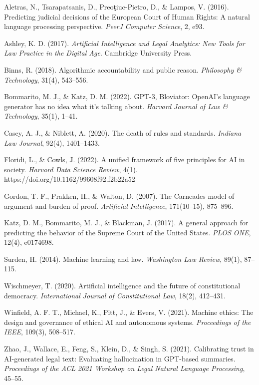 \documentclass[12pt,a4paper]{article}
\begin{document}
\begin{thebibliography}{99}

Aletras, N., Tsarapatsanis, D., Preoţiuc-Pietro, D., \& Lampos, V. (2016). Predicting judicial decisions of the European Court of Human Rights: A natural language processing perspective. \textit{PeerJ Computer Science}, 2, e93.

Ashley, K. D. (2017). \textit{Artificial Intelligence and Legal Analytics: New Tools for Law Practice in the Digital Age}. Cambridge University Press.

Binns, R. (2018). Algorithmic accountability and public reason. \textit{Philosophy \& Technology}, 31(4), 543–556.

Bommarito, M. J., \& Katz, D. M. (2022). GPT-3, Bloviator: OpenAI's language generator has no idea what it's talking about. \textit{Harvard Journal of Law \& Technology}, 35(1), 1–41.

Casey, A. J., \& Niblett, A. (2020). The death of rules and standards. \textit{Indiana Law Journal}, 92(4), 1401–1433.

Floridi, L., \& Cowls, J. (2022). A unified framework of five principles for AI in society. \textit{Harvard Data Science Review}, 4(1). https://doi.org/10.1162/99608f92.f2b22a52

Gordon, T. F., Prakken, H., \& Walton, D. (2007). The Carneades model of argument and burden of proof. \textit{Artificial Intelligence}, 171(10–15), 875–896.

Katz, D. M., Bommarito, M. J., \& Blackman, J. (2017). A general approach for predicting the behavior of the Supreme Court of the United States. \textit{PLOS ONE}, 12(4), e0174698.

Surden, H. (2014). Machine learning and law. \textit{Washington Law Review}, 89(1), 87–115.

Wischmeyer, T. (2020). Artificial intelligence and the future of constitutional democracy. \textit{International Journal of Constitutional Law}, 18(2), 412–431.

Winfield, A. F. T., Michael, K., Pitt, J., \& Evers, V. (2021). Machine ethics: The design and governance of ethical AI and autonomous systems. \textit{Proceedings of the IEEE}, 109(3), 508–517.

Zhao, J., Wallace, E., Feng, S., Klein, D., \& Singh, S. (2021). Calibrating trust in AI-generated legal text: Evaluating hallucination in GPT-based summaries. \textit{Proceedings of the ACL 2021 Workshop on Legal Natural Language Processing}, 45–55.

\end{thebibliography}
\end{document}
